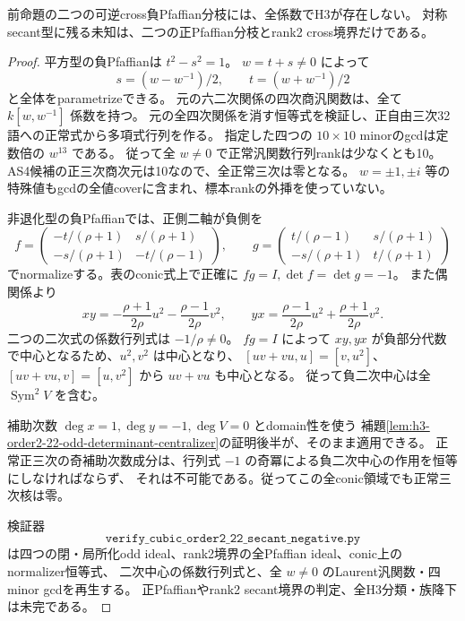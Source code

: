 \begin{theorem}\label{thm:h3-order2-22-secant-negative-empty}
前命題の二つの可逆cross負Pfaffian分枝には、全係数でH3が存在しない。
対称secant型に残る未知は、二つの正Pfaffian分枝とrank2 cross境界だけである。
\end{theorem}
\begin{proof}
平方型の負Pfaffianは $t^2-s^2=1$。
$w=t+s\ne0$ によって
\[
 s=(w-w^{-1})/2,\qquad t=(w+w^{-1})/2
\]
と全体をparametrizeできる。
元の六二次関係の四次商汎関数は、全て $k[w,w^{-1}]$ 係数を持つ。
元の全四次関係を消す恒等式を検証し、正自由三次32語への正常式から多項式行列を作る。
指定した四つの $10\times10$ minorのgcdは定数倍の $w^{13}$ である。
従って全 $w\ne0$ で正常汎関数行列rankは少なくとも10。
AS4候補の正三次商次元は10なので、全正常三次は零となる。
$w=\pm1,\pm i$ 等の特殊値もgcdの全値coverに含まれ、標本rankの外挿を使っていない。

非退化型の負Pfaffianでは、正側二軸が負側を
\[
 f=\begin{pmatrix}-t/(\rho+1)&s/(\rho+1)\\-s/(\rho+1)&-t/(\rho-1)\end{pmatrix},\qquad
 g=\begin{pmatrix}t/(\rho-1)&s/(\rho+1)\\-s/(\rho+1)&t/(\rho+1)\end{pmatrix}
\]
でnormalizeする。表のconic式上で正確に $fg=I,\det f=\det g=-1$。
また偶関係より
\[
 xy=-\frac{\rho+1}{2\rho}u^2-\frac{\rho-1}{2\rho}v^2,\qquad
 yx=\frac{\rho-1}{2\rho}u^2+\frac{\rho+1}{2\rho}v^2.
\]
二つの二次式の係数行列式は $-1/\rho\ne0$。
$fg=I$ によって $xy,yx$ が負部分代数で中心となるため、$u^2,v^2$ は中心となり、
$[uv+vu,u]=[v,u^2]$、$[uv+vu,v]=[u,v^2]$ から $uv+vu$ も中心となる。
従って負二次中心は全 $\operatorname{Sym}^2V$ を含む。

補助次数 $\deg x=1,\deg y=-1,\deg V=0$ とdomain性を使う
補題\ref{lem:h3-order2-22-odd-determinant-centralizer}の証明後半が、そのまま適用できる。
正常正三次の奇補助次数成分は、行列式 $-1$ の奇冪による負二次中心の作用を恒等にしなければならず、
それは不可能である。従ってこの全conic領域でも正常三次核は零。

検証器
\[
\texttt{verify\_cubic\_order2\_22\_secant\_negative.py}
\]
は四つの閉・局所化odd ideal、rank2境界の全Pfaffian ideal、conic上のnormalizer恒等式、
二次中心の係数行列式と、全 $w\ne0$ のLaurent汎関数・四minor gcdを再生する。
正Pfaffianやrank2 secant境界の判定、全H3分類・族降下は未完である。
\end{proof}

